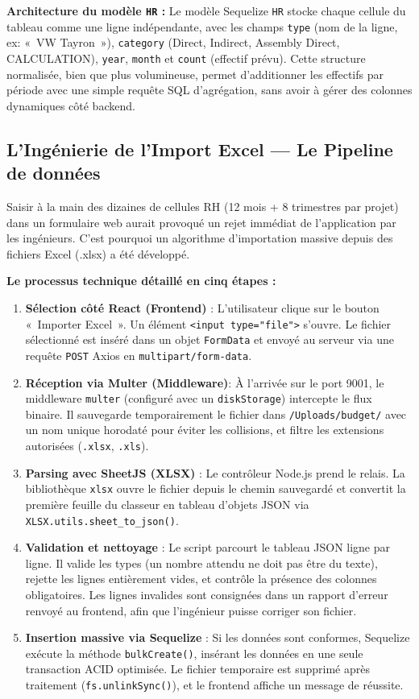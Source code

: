 \textbf{Architecture du modèle \texttt{HR} :}
Le modèle Sequelize \texttt{HR} stocke chaque cellule du tableau comme une ligne indépendante, avec les champs \texttt{type} (nom de la ligne, ex: «~VW Tayron~»), \texttt{category} (Direct, Indirect, Assembly Direct, CALCULATION), \texttt{year}, \texttt{month} et \texttt{count} (effectif prévu). Cette structure normalisée, bien que plus volumineuse, permet d'additionner les effectifs par période avec une simple requête SQL d'agrégation, sans avoir à gérer des colonnes dynamiques côté backend.

\subsection{L'Ingénierie de l'Import Excel — Le Pipeline de données}
Saisir à la main des dizaines de cellules RH (12 mois + 8 trimestres par projet) dans un formulaire web aurait provoqué un rejet immédiat de l'application par les ingénieurs. C'est pourquoi un algorithme d'importation massive depuis des fichiers Excel (.xlsx) a été développé.

\textbf{Le processus technique détaillé en cinq étapes :}
\begin{enumerate}
    \item \textbf{Sélection côté React (Frontend)} : L'utilisateur clique sur le bouton «~Importer Excel~». Un élément \texttt{<input type="file">} s'ouvre. Le fichier sélectionné est inséré dans un objet \texttt{FormData} et envoyé au serveur via une requête \texttt{POST} Axios en \texttt{multipart/form-data}.
    \item \textbf{Réception via Multer (Middleware)}: À l'arrivée sur le port 9001, le middleware \texttt{multer} (configuré avec un \texttt{diskStorage}) intercepte le flux binaire. Il sauvegarde temporairement le fichier dans \texttt{/Uploads/budget/} avec un nom unique horodaté pour éviter les collisions, et filtre les extensions autorisées (\texttt{.xlsx}, \texttt{.xls}).
    \item \textbf{Parsing avec SheetJS (XLSX)} : Le contrôleur Node.js prend le relais. La bibliothèque \texttt{xlsx} ouvre le fichier depuis le chemin sauvegardé et convertit la première feuille du classeur en tableau d'objets JSON via \texttt{XLSX.utils.sheet\_to\_json()}.
    \item \textbf{Validation et nettoyage} : Le script parcourt le tableau JSON ligne par ligne. Il valide les types (un nombre attendu ne doit pas être du texte), rejette les lignes entièrement vides, et contrôle la présence des colonnes obligatoires. Les lignes invalides sont consignées dans un rapport d'erreur renvoyé au frontend, afin que l'ingénieur puisse corriger son fichier.
    \item \textbf{Insertion massive via Sequelize} : Si les données sont conformes, Sequelize exécute la méthode \texttt{bulkCreate()}, insérant les données en une seule transaction ACID optimisée. Le fichier temporaire est supprimé après traitement (\texttt{fs.unlinkSync()}), et le frontend affiche un message de réussite.
\end{enumerate}

